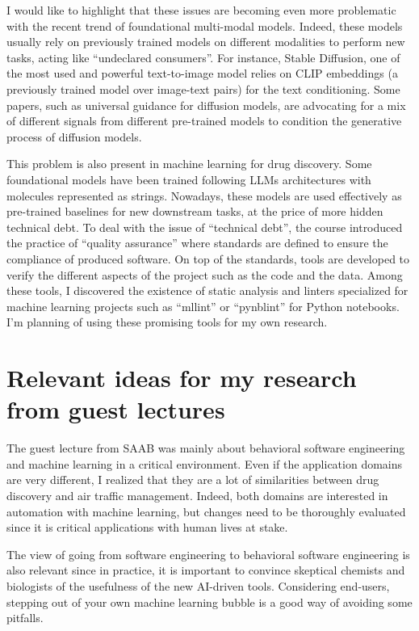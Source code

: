 \documentclass[11pt,a4paper]{article}
\begin{document}
I would like to highlight that these issues are becoming even more problematic with the recent trend of foundational multi-modal models. Indeed, these models usually rely on previously trained models on different modalities to perform new tasks, acting like “undeclared consumers”. For instance, Stable Diffusion, one of the most used and powerful text-to-image model relies on CLIP embeddings (a previously trained model over image-text pairs) for the text conditioning. Some papers, such as universal guidance for diffusion models, are advocating for a mix of different signals from different pre-trained models to condition the generative process of diffusion models.

This problem is also present in machine learning for drug discovery. Some foundational models have been trained following LLMs architectures with molecules represented as strings. Nowadays, these models are used effectively as pre-trained baselines for new downstream tasks, at the price of more hidden technical debt.
To deal with the issue of “technical debt”, the course introduced the practice of “quality assurance” where standards are defined to ensure the compliance of produced software. On top of the standards, tools are developed to verify the different aspects of the project such as the code and the data. Among these tools, I discovered the existence of static analysis and linters specialized for machine learning projects such as “mllint” or “pynblint” for Python notebooks. I’m planning of using these promising tools for my own research.

\section{Relevant ideas for my research from guest lectures}
The guest lecture from SAAB was mainly about behavioral software engineering and machine learning in a critical environment. Even if the application domains are very different, I realized that they are a lot of similarities between drug discovery and air traffic management. Indeed, both domains are interested in automation with machine learning, but changes need to be thoroughly evaluated since it is critical applications with human lives at stake.

The view of going from software engineering to behavioral software engineering is also relevant since in practice, it is important to convince skeptical chemists and biologists of the usefulness of the new AI-driven tools. Considering end-users, stepping out of your own machine learning bubble is a good way of avoiding some pitfalls.
\end{document}
